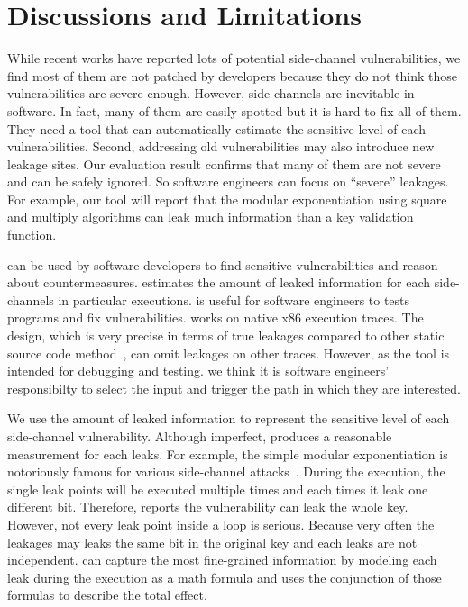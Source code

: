 \section{Discussions and Limitations}
While recent works have reported lots
of potential side-channel vulnerabilities, we find most of them are not patched by
developers because they do not think those vulnerabilities are severe enough.
However, side-channels are inevitable in software. In fact, many of them
are easily spotted but it is hard to fix all of them. They need a
tool that can automatically estimate the sensitive level of each vulnerabilities.
Second, addressing old vulnerabilities may also introduce new leakage
sites. Our evaluation result confirms that many of them are not 
severe and can be safely ignored. So software engineers can focus on
``severe'' leakages. For example, our tool will report that 
the modular exponentiation using square and multiply algorithms can
leak much information than a key validation function.

\tool{} can be used by software developers to find sensitive vulnerabilities
and reason about countermeasures.
\tool{} estimates the amount of leaked information for each side-channels
in particular executions. \tool{} is useful for software
engineers to tests programs and fix vulnerabilities.
\tool{} works on native x86 execution traces. The design, which is very
precise in terms of true leakages compared to other static source code
method~\cite{197207,BacelarAlmeida:2013:FVS:2483313.2483334}, can omit
leakages on other traces. However, as the tool is intended for debugging and testing.
we think it is software engineers' responsibilty to select the input and trigger the 
path in which they are interested.

We use the amount of leaked information to represent the sensitive level of each
side-channel vulnerability. Although imperfect, \tool{} produces a reasonable
measurement for each leaks. For example, the simple modular exponentiation is notoriously
famous for various side-channel attacks~\cite{kocher1996timing}. During the execution, the single 
leak points will be executed multiple times and each times it leak one different bit.
Therefore, \tool{} reports the vulnerability can leak the whole key. However, not every
leak point inside a loop is serious. Because very often the leakages may leaks the same
bit in the original key and each leaks are not independent. \tool{} can capture the most 
fine-grained information by
modeling each leak during the execution 
as a math formula and uses the conjunction of those formulas to describe the total effect.

